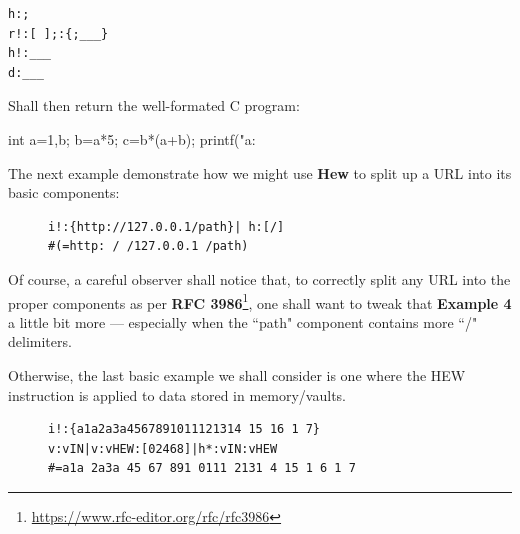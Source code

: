 \documentclass[a4paper, 18pt]{book} %
\begin{document}
  \centering
  \begin{tcolorbox}[teaterminalstyle, title=H: EXAMPLE 3]
  \begin{lstlisting}[language=TEA]
h:; 
r!:[ ];:{;___}
h!:___
d:___
   \end{lstlisting}
  \end{tcolorbox}



Shall then return the well-formated C program:




  \begin{tcbverbatim}[title=Sample Output Un-Minified C Program]
int a=1,b;
b=a*5;
c=b*(a+b);
printf("a:%
  \end{tcbverbatim}




The next example demonstrate how we might use \textbf{Hew} to split up a URL into its basic components:



\begin{figure}[H]
 \Large
  \centering
  \begin{tcolorbox}[teaterminalstyle, title=H: EXAMPLE 4]
  \begin{lstlisting}[language=TEA]
i!:{http://127.0.0.1/path}| h:[/]
#(=http: / /127.0.0.1 /path)
   \end{lstlisting}
  \end{tcolorbox}
\end{figure}


Of course, a careful observer shall notice that, to correctly split any URL into the proper components as per \textbf{RFC 3986}\footnote{\url{https://www.rfc-editor.org/rfc/rfc3986}}, one shall want to tweak that \textbf{Example 4} a little bit more --- especially when the ``path" component contains more ``/" delimiters.


Otherwise, the last basic example we shall consider is one where the HEW instruction is applied to data stored in memory/vaults. 


\begin{figure}[H]
 \Large
  \centering
  \begin{tcolorbox}[teaterminalstyle, title=H: EXAMPLE 5]
  \begin{lstlisting}[language=TEA]
i!:{a1a2a3a4567891011121314 15 16 1 7}
v:vIN|v:vHEW:[02468]|h*:vIN:vHEW
#=a1a 2a3a 45 67 891 0111 2131 4 15 1 6 1 7
   \end{lstlisting}
  \end{tcolorbox}
\end{figure}
\end{document}
